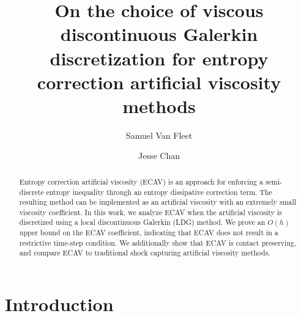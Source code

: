 \documentclass{elsarticle}
\theoremstyle{definition}
\theoremstyle{plain}
\theoremstyle{plain}
\begin{document}
\begin{frontmatter}
\title{On the choice of viscous discontinuous Galerkin discretization for entropy correction artificial viscosity methods}

\author[rice]{Samuel Van Fleet\texorpdfstring{}{}}

\author[Oden,ASE]{Jesse Chan}


\address[rice]{Department of Computational Applied Mathematics and Operations Research, Rice University}
\address[Oden]{Oden Institute for Computational Engineering and Sciences, The University of Texas at Austin}
\address[ASE]{Department of Aerospace Engineering \& Engineering Mechanics, The University of Texas at Austin}

\date{}

\begin{abstract}
Entropy correction artificial viscosity (ECAV) is an approach for enforcing a semi-discrete entropy inequality through an entropy dissipative correction term. The resulting method can be implemented as an artificial viscosity with an extremely small viscosity coefficient. In this work, we analyze ECAV when the artificial viscosity is discretized using a local discontinuous Galerkin (LDG) method. We prove an $O(h)$ upper bound on the ECAV coefficient, indicating that ECAV does not result in a restrictive time-step condition. We additionally show that ECAV is contact preserving, and compare ECAV to traditional shock capturing artificial viscosity methods. 
\end{abstract}
\end{frontmatter}


\section{Introduction} %
\end{document}

